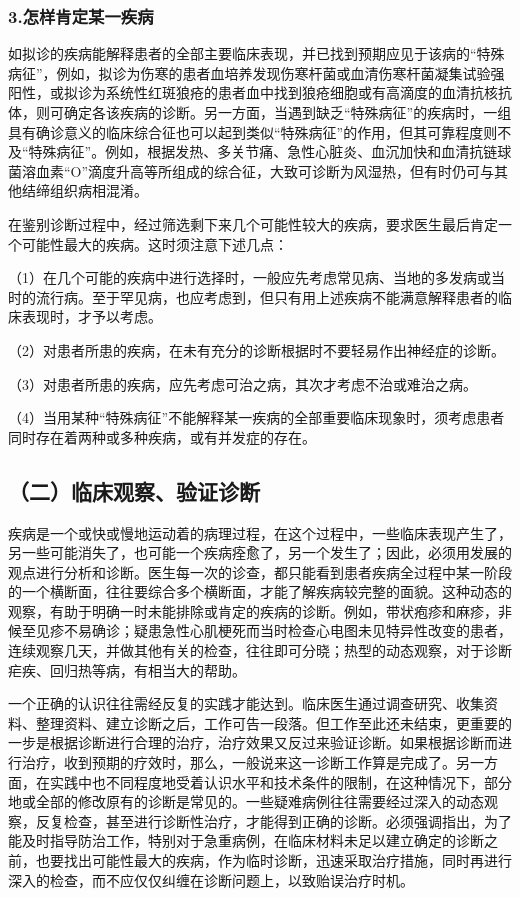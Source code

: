 \subsubsection{3.怎样肯定某一疾病}

如拟诊的疾病能解释患者的全部主要临床表现，并已找到预期应见于该病的“特殊病征”，例如，拟诊为伤寒的患者血培养发现伤寒杆菌或血清伤寒杆菌凝集试验强阳性，或拟诊为系统性红斑狼疮的患者血中找到狼疮细胞或有高滴度的血清抗核抗体，则可确定各该疾病的诊断。另一方面，当遇到缺乏“特殊病征”的疾病时，一组具有确诊意义的临床综合征也可以起到类似“特殊病征”的作用，但其可靠程度则不及“特殊病征”。例如，根据发热、多关节痛、急性心脏炎、血沉加快和血清抗链球菌溶血素“O”滴度升高等所组成的综合征，大致可诊断为风湿热，但有时仍可与其他结缔组织病相混淆。

在鉴别诊断过程中，经过筛选剩下来几个可能性较大的疾病，要求医生最后肯定一个可能性最大的疾病。这时须注意下述几点：

（1）在几个可能的疾病中进行选择时，一般应先考虑常见病、当地的多发病或当时的流行病。至于罕见病，也应考虑到，但只有用上述疾病不能满意解释患者的临床表现时，才予以考虑。

（2）对患者所患的疾病，在未有充分的诊断根据时不要轻易作出神经症的诊断。

（3）对患者所患的疾病，应先考虑可治之病，其次才考虑不治或难治之病。

（4）当用某种“特殊病征”不能解释某一疾病的全部重要临床现象时，须考虑患者同时存在着两种或多种疾病，或有并发症的存在。

\subsection{（二）临床观察、验证诊断}

疾病是一个或快或慢地运动着的病理过程，在这个过程中，一些临床表现产生了，另一些可能消失了，也可能一个疾病痊愈了，另一个发生了；因此，必须用发展的观点进行分析和诊断。医生每一次的诊查，都只能看到患者疾病全过程中某一阶段的一个横断面，往往要综合多个横断面，才能了解疾病较完整的面貌。这种动态的观察，有助于明确一时未能排除或肯定的疾病的诊断。例如，带状疱疹和麻疹，非候至见疹不易确诊；疑患急性心肌梗死而当时检查心电图未见特异性改变的患者，连续观察几天，并做其他有关的检查，往往即可分晓；热型的动态观察，对于诊断疟疾、回归热等病，有相当大的帮助。

一个正确的认识往往需经反复的实践才能达到。临床医生通过调查研究、收集资料、整理资料、建立诊断之后，工作可告一段落。但工作至此还未结束，更重要的一步是根据诊断进行合理的治疗，治疗效果又反过来验证诊断。如果根据诊断而进行治疗，收到预期的疗效时，那么，一般说来这一诊断工作算是完成了。另一方面，在实践中也不同程度地受着认识水平和技术条件的限制，在这种情况下，部分地或全部的修改原有的诊断是常见的。一些疑难病例往往需要经过深入的动态观察，反复检查，甚至进行诊断性治疗，才能得到正确的诊断。必须强调指出，为了能及时指导防治工作，特别对于急重病例，在临床材料未足以建立确定的诊断之前，也要找出可能性最大的疾病，作为临时诊断，迅速采取治疗措施，同时再进行深入的检查，而不应仅仅纠缠在诊断问题上，以致贻误治疗时机。

